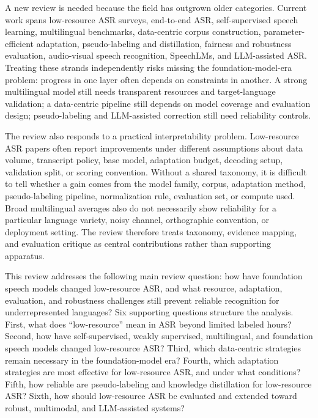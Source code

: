 \documentclass[pdflatex,sn-basic,iicol]{sn-jnl}
\theoremstyle{thmstyleone}
\theoremstyle{thmstyletwo}
\theoremstyle{thmstylethree}
\begin{document}
A new review is needed because the field has outgrown older categories. Current work spans low-resource ASR surveys, end-to-end ASR, self-supervised speech learning, multilingual benchmarks, data-centric corpus construction, parameter-efficient adaptation, pseudo-labeling and distillation, fairness and robustness evaluation, audio-visual speech recognition, SpeechLMs, and LLM-assisted ASR. Treating these strands independently risks missing the foundation-model-era problem: progress in one layer often depends on constraints in another. A strong multilingual model still needs transparent resources and target-language validation; a data-centric pipeline still depends on model coverage and evaluation design; pseudo-labeling and LLM-assisted correction still need reliability controls.

The review also responds to a practical interpretability problem. Low-resource ASR papers often report improvements under different assumptions about data volume, transcript policy, base model, adaptation budget, decoding setup, validation split, or scoring convention. Without a shared taxonomy, it is difficult to tell whether a gain comes from the model family, corpus, adaptation method, pseudo-labeling pipeline, normalization rule, evaluation set, or compute used. Broad multilingual averages also do not necessarily show reliability for a particular language variety, noisy channel, orthographic convention, or deployment setting. The review therefore treats taxonomy, evidence mapping, and evaluation critique as central contributions rather than supporting apparatus.

This review addresses the following main review question: how have foundation speech models changed low-resource ASR, and what resource, adaptation, evaluation, and robustness challenges still prevent reliable recognition for underrepresented languages? Six supporting questions structure the analysis. First, what does ``low-resource'' mean in ASR beyond limited labeled hours? Second, how have self-supervised, weakly supervised, multilingual, and foundation speech models changed low-resource ASR? Third, which data-centric strategies remain necessary in the foundation-model era? Fourth, which adaptation strategies are most effective for low-resource ASR, and under what conditions? Fifth, how reliable are pseudo-labeling and knowledge distillation for low-resource ASR? Sixth, how should low-resource ASR be evaluated and extended toward robust, multimodal, and LLM-assisted systems?
\end{document}
